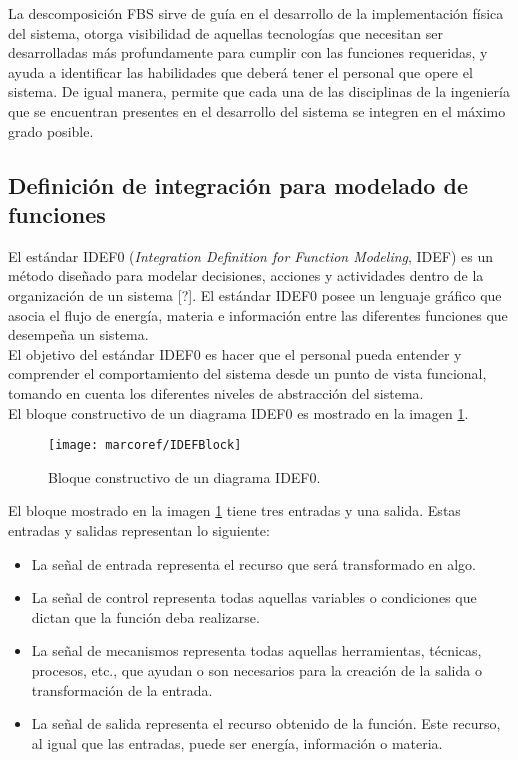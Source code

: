 \noindent La descomposici\'on FBS sirve de gu\'ia en el desarrollo de la implementaci\'on f\'isica del sistema, otorga visibilidad de aquellas tecnolog\'ias que necesitan ser desarrolladas m\'as profundamente para cumplir con las funciones requeridas, y ayuda a identificar las habilidades que deber\'a tener el personal que opere el sistema. De igual manera, permite que cada una de las disciplinas de la ingenier\'ia que se encuentran presentes en el desarrollo del sistema se integren en el m\'aximo grado posible. 

		\subsection{Definici\'on de integraci\'on para modelado de funciones} \label{subsec:idef0}
El est\'andar IDEF0 (\textit{Integration Definition for Function Modeling}, IDEF) es un m\'etodo dise\~{n}ado para modelar decisiones, acciones y actividades dentro de la organizaci\'on de un sistema [?]. El est\'andar IDEF0 posee un lenguaje gr\'afico que asocia el flujo de energ\'ia, materia e informaci\'on entre las diferentes funciones que desempe\~{n}a un sistema.\\

\noindent El objetivo del est\'andar IDEF0 es hacer que el personal pueda entender y comprender el comportamiento del sistema desde un punto de vista funcional, tomando en cuenta los diferentes niveles de abstracci\'on del sistema.\\

\noindent El bloque constructivo de un diagrama IDEF0 es mostrado en la imagen \ref{img:bloqueidef0}.

\begin{figure}[H]
	\centering
		\texttt{[image: marcoref/IDEFBlock]}
	\caption{Bloque constructivo de un diagrama IDEF0.}
	\label{img:bloqueidef0}
\end{figure}

\noindent El bloque mostrado en la imagen \ref{img:bloqueidef0} tiene tres entradas y una salida. Estas entradas y salidas representan lo siguiente:

\begin{itemize}
	\item La se\~{n}al de entrada representa el recurso que ser\'a transformado en algo.
	\item La se\~{n}al de control representa todas aquellas variables o condiciones que dictan que la funci\'on deba realizarse.
	\item La se\~{n}al de mecanismos representa todas aquellas herramientas, t\'ecnicas, procesos, etc., que ayudan o son necesarios para la creaci\'on de la salida o transformaci\'on de la entrada.
	\item La se\~{n}al de salida representa el recurso obtenido de la funci\'on. Este recurso, al igual que las entradas, puede ser energ\'ia, informaci\'on o materia.
\end{itemize}

